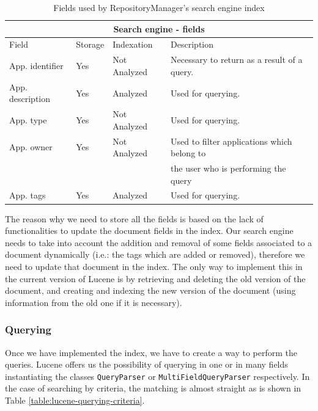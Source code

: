 \begin{table}[h!]
	\small
    \begin{center}
		\begin{tabular}{||l|l|l|l||}
        
		\hline \hline
		\multicolumn{4}{||c||}{\bfseries{Search engine - fields}} \\
		\hline
		\hline 
			Field & Storage & Indexation & Description\\
		\hline \hline
			App. identifier &  Yes & Not Analyzed & Necessary to return as a result of a
			query.\\
			\hline
			App. description &  Yes & Analyzed & Used for querying.\\
			\hline
			App. type &  Yes & Not Analyzed & Used for querying.\\
			\hline
			App. owner &  Yes & Not Analyzed & Used to filter applications which belong
			to \\
			 & & & the user who is performing the query\\
			\hline
			App. tags &  Yes & Analyzed & Used for querying.\\
			\hline
			\hline

		\end{tabular}
		\caption{\label{table:lucene-se-fields} Fields used by RepositoryManager's
		search engine index}
	\end{center}
\end{table}

The reason why we need to store all the fields is based on the lack of
functionalities to update the document fields in the index. Our search engine
needs to take into account the addition and removal of some fields associated
to a document dynamically (i.e.: the tags which are added or removed), therefore
we need to update that document in the index. The only way to implement this in the
current version of Lucene is by retrieving and deleting the old version of the
document, and creating and indexing the new version of the document (using
information from the old one if it is necessary).

\subsubsection{Querying}
Once we have implemented the index, we have to create a way to perform the
queries.
\newline
Lucene offers us the possibility of querying in one or in many fields
instantiating the classes \verb|QueryParser| or \verb|MultiFieldQueryParser|
respectively. In the case of searching by criteria, the matching is almost
straight as is shown in Table \ref{table:lucene-querying-criteria}.

